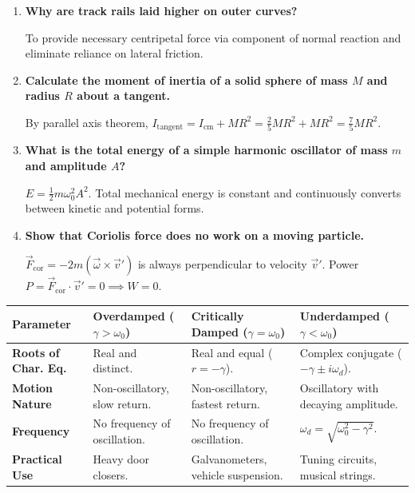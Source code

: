 \documentclass[12pt,a4paper]{article}
\newcommand{\Q}[1]{\textbf{#1}\par\noindent\ignorespaces}
\begin{document}
\begin{tcolorbox}[exambox, title={\textbf{Frequently Asked / Viva Questions}}]
\begin{enumerate}[topsep=0pt, label=\textbf{Q\arabic*.}, itemsep=5pt]
  \item \Q{Why are track rails laid higher on outer curves?}
  To provide necessary centripetal force via component of normal reaction and eliminate reliance on lateral friction.

  \item \Q{Calculate the moment of inertia of a solid sphere of mass $M$ and radius $R$ about a tangent.}
  By parallel axis theorem, $I_{\text{tangent}} = I_{\text{cm}} + M R^2 = \frac{2}{5}M R^2 + M R^2 = \frac{7}{5}M R^2$.

  \item \Q{What is the total energy of a simple harmonic oscillator of mass $m$ and amplitude $A$?}
  $E = \frac{1}{2} m \omega_0^2 A^2$. Total mechanical energy is constant and continuously converts between kinetic and potential forms.

  \item \Q{Show that Coriolis force does no work on a moving particle.}
  $\vec{F}_{\text{cor}} = -2m(\vec{\omega} \times \vec{v}')$ is always perpendicular to velocity $\vec{v}'$. Power $P = \vec{F}_{\text{cor}} \cdot \vec{v}' = 0 \implies W = 0$.
\end{enumerate}
\end{tcolorbox}

\begin{tcolorbox}[tikzbox, title={Summary Comparison of Damped Motion Regimes}]
\centering
\begin{tabularx}{\linewidth}{|B{3.0cm}|Y|Y|Y|}
\hline
\textbf{Parameter} & \textbf{Overdamped ($\gamma > \omega_0$)} & \textbf{Critically Damped ($\gamma = \omega_0$)} & \textbf{Underdamped ($\gamma < \omega_0$)} \\
\hline
\textbf{Roots of Char. Eq.} & Real and distinct. & Real and equal ($r = -\gamma$). & Complex conjugate ($-\gamma \pm i\omega_d$). \\
\hline
\textbf{Motion Nature} & Non-oscillatory, slow return. & Non-oscillatory, fastest return. & Oscillatory with decaying amplitude. \\
\hline
\textbf{Frequency} & No frequency of oscillation. & No frequency of oscillation. & $\omega_d = \sqrt{\omega_0^2 - \gamma^2}$. \\
\hline
\textbf{Practical Use} & Heavy door closers. & Galvanometers, vehicle suspension. & Tuning circuits, musical strings. \\
\hline
\end{tabularx}
\end{tcolorbox}
\end{document}
